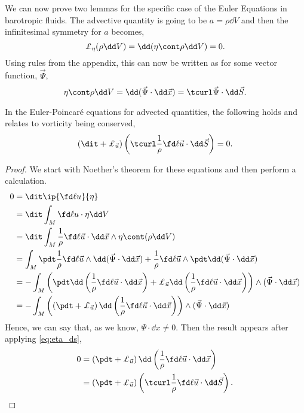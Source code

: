 \noindent
We can now prove two lemmas for the specific case of the Euler Equations in barotropic fluids. The advective quantity is going to be $a = \rho\dd V$ and then the infinitesimal symmetry for $a$ becomes,
$$ \pounds_\eta (\rho \dd V) = \dd (\eta \cont \rho \dd V) = 0. $$
Using rules from the appendix, this can now be written as for some vector function, $\vec\Psi$,
\begin{equation}
  \eta \cont \rho \dd V = \dd (\vec \Psi \cdot \dd \vec x) = \tcurl \vec\Psi \cdot \dd \vec S.\label{eq:eta_ds}
\end{equation}
\noindent
\begin{nlemma}
  In the Euler-Poincar\'e equations for advected quantities, the following holds and relates to vorticity being conserved,
  \begin{equation}
    \left( \dit + \pounds_{\vec u} \right)\left(\tcurl \frac{1}{\rho}\fd \ell {\vec u} \cdot \dd \vec S\right) = 0.\label{eq:voricity}
  \end{equation}
\end{nlemma}
\begin{proof}
  We start with Noether's theorem for these equations and then perform a calculation.
  \begin{align*}
    0 &= \dit \ip{\fd \ell u}{\eta} \\
    &= \dit \int_M \fd \ell u \cdot \eta\dd V \\
    &= \dit \int_M \frac{1}{\rho}\fd \ell {\vec u} \cdot \dd \vec x \wedge \eta \cont (\rho \dd V) \\
    &= \int_M \pdt \frac{1}{\rho}\fd \ell {\vec u} \wedge \dd(\vec\Psi \cdot \dd \vec x) + \frac{1}{\rho}\fd \ell {\vec u} \wedge \pdt \dd(\vec\Psi \cdot \dd \vec x) \\
    &= - \int_M \left( \pdt \dd \left( \frac{1}{\rho}\fd \ell {\vec u} \cdot \dd \vec x \right) + \pounds_{\vec u} \dd \left( \frac{1}{\rho}\fd \ell {\vec u} \cdot \dd \vec x \right) \right) \wedge (\vec\Psi \cdot \dd \vec x)  \\
    &= - \int_M \left(\left( \pdt + \pounds_{\vec u} \right) \dd \left( \frac{1}{\rho}\fd \ell {\vec u} \cdot \dd \vec x \right)\right) \wedge (\vec\Psi \cdot \dd \vec x)
  \end{align*}
  Hence, we can say that, as we know, $\Psi \cdot \dd x \ne 0$. Then the result appears after applying \eqref{eq:eta_ds},
  \begin{align*}
    0 &= \left( \pdt + \pounds_{\vec u} \right) \dd \left( \frac{1}{\rho}\fd \ell {\vec u} \cdot \dd \vec x \right) \\
    &= \left( \pdt + \pounds_{\vec u} \right) \left( \tcurl \frac{1}{\rho}\fd \ell {\vec u} \cdot \dd \vec S \right).
  \end{align*}
\end{proof}

